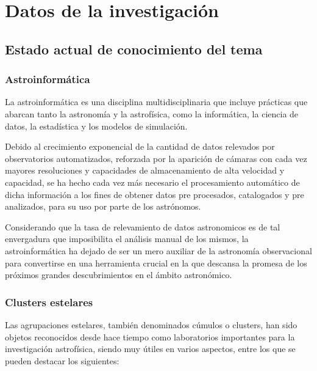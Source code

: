 \documentclass[
	11pt,oneside,a4paper,
	fleqn,
	article
]{memoir}
\begin{document}




\section{Datos de la investigación}

\subsection{Estado actual de conocimiento del tema}

\subsubsection{Astroinformática}

La astroinformática es una disciplina multidisciplinaria que incluye prácticas que abarcan tanto la astronomía y la astrofísica, como la informática, la ciencia de datos, la estadística y los modelos de simulación\cite{borne2009astroinformatics}.

Debido al crecimiento exponencial de la cantidad de datos relevados por observatorios automatizados, reforzada por la aparición de cámaras con cada vez mayores resoluciones y capacidades de almacenamiento de alta velocidad y capacidad, se ha hecho cada vez más necesario el procesamiento automático de dicha información a los fines de obtener datos pre procesados, catalogados y pre analizados, para su uso por parte de los astrónomos.

Considerando que la tasa de relevamiento de datos astronomicos es de tal envergadura que imposibilita el análisis manual de los mismos, la astroinformática ha dejado de ser un mero auxiliar de la astronomía observacional para convertirse en una herramienta crucial en la que descansa la promesa de los próximos grandes descubrimientos en el ámbito astronómico\cite{mahabal2024astroinformatics}.

\subsubsection{Clusters estelares}

Las agrupaciones estelares, también denominados cúmulos o clusters, han sido objetos reconocidos desde hace tiempo como laboratorios importantes para la investigación astrofísica, siendo muy útiles en varios aspectos, entre los que se pueden destacar los siguientes:
\end{document}

